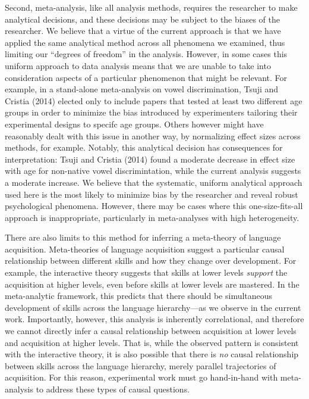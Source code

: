 \documentclass[english,floatsintext,man]{apa6}
\begin{document}
Second, meta-analysis, like all analysis methods, requires the
researcher to make analytical decisions, and these decisions may be
subject to the biases of the researcher. We believe that a virtue of the
current approach is that we have applied the same analytical method
across all phenomena we examined, thus limiting our \enquote{degrees of
freedom} in the analysis. However, in some cases this uniform approach
to data analysis means that we are unable to take into consideration
aspects of a particular phenomenon that might be relevant. For example,
in a stand-alone meta-analysis on vowel discrimination, Tsuji and
Cristia (2014) elected only to include papers that tested at least two
different age groups in order to minimize the bias introduced by
experimenters tailoring their experimental designs to specifc age
groups. Others however might have reasonably dealt with this issue in
another way, by normalizing effect sizes across methods, for example.
Notably, this analytical decision has consequences for interpretation:
Tsuji and Cristia (2014) found a moderate decrease in effect size with
age for non-native vowel discrimintation, while the current analysis
suggests a moderate increase. We believe that the systematic, uniform
analytical approach used here is the most likely to minimize bias by the
researcher and reveal robust psychological phenomena. However, there may
be cases where this one-size-fits-all approach is inappropriate,
particularly in meta-analyses with high heterogeneity.

There are also limits to this method for inferring a meta-theory of
language acquisition. Meta-theories of language acquisition suggest a
particular causal relationship between different skills and how they
change over development. For example, the interactive theory suggests
that skills at lower levels \emph{support} the acquisition at higher
levels, even before skills at lower levels are mastered. In the
meta-analytic framework, this predicts that there should be simultaneous
development of skills across the language hierarchy---as we observe in
the current work. Importantly, however, this analysis is inherently
correlational, and therefore we cannot directly infer a causal
relationship between acquisition at lower levels and acquisition at
higher levels. That is, while the observed pattern is consistent with
the interactive theory, it is also possible that there is \emph{no}
causal relationship between skills across the language hierarchy, merely
parallel trajectories of acquisition. For this reason, experimental work
must go hand-in-hand with meta-analysis to address these types of causal
questions.
\end{document}
